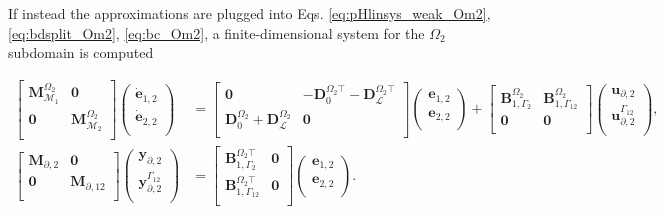 If instead the approximations are plugged into  Eqs. \ref{eq:pHlinsys_weak_Om2}, \ref{eq:bdsplit_Om2}, \ref{eq:bc_Om2}, a finite-dimensional system for the $\Omega_2$ subdomain is computed

\begin{equation}\label{eq:pHlinsys_findim_Om2}
\begin{aligned}
\begin{bmatrix}
\mathbf{M}_{\mathcal{M}_1}^{\Omega_2} & \mathbf{0} \\
\mathbf{0} & \mathbf{M}_{\mathcal{M}_2}^{\Omega_2} \\
\end{bmatrix}
\begin{pmatrix}
\dot{\mathbf{e}}_{1, 2} \\
\dot{\mathbf{e}}_{2, 2} \\
\end{pmatrix}
&= \begin{bmatrix}
\mathbf{0} & -\mathbf{D}_{0}^{\Omega_2 \top} - \mathbf{D}_{\mathcal{L}}^{\Omega_2 \top} \\
\mathbf{D}_{0}^{\Omega_2} + \mathbf{D}_{\mathcal{L}}^{\Omega_2} & \mathbf{0} \\
\end{bmatrix} 
\begin{pmatrix}
\mathbf{e}_{1, 2} \\
\mathbf{e}_{2, 2} \\
\end{pmatrix} + 
\begin{bmatrix}
\mathbf{B}_{1, \Gamma_2}^{\Omega_2} & \mathbf{B}_{1, \Gamma_{12}}^{\Omega_2}\\
\mathbf{0} & \mathbf{0}\\
\end{bmatrix}
\begin{pmatrix}
\mathbf{u}_{\partial, 2} \\
\mathbf{u}_{\partial, 2}^{\Gamma_{12}} \\
\end{pmatrix}, \\
\begin{bmatrix}
\mathbf{M}_{\partial, 2} & \mathbf{0}  \\
\mathbf{0} & \mathbf{M}_{\partial, 12} \\
\end{bmatrix}
\begin{pmatrix}
\mathbf{y}_{\partial, 2} \\
\mathbf{y}_{\partial, 2}^{\Gamma_{12}} \\
\end{pmatrix}
&= 
\begin{bmatrix}
\mathbf{B}_{1, \Gamma_2}^{\Omega_2 \top} & \mathbf{0} \\
\mathbf{B}_{1, \Gamma_{12}}^{\Omega_2 \top} & \mathbf{0} \\
\end{bmatrix}\begin{pmatrix}
\mathbf{e}_{1, 2} \\
\mathbf{e}_{2, 2} \\
\end{pmatrix}.
\end{aligned}
\end{equation}

